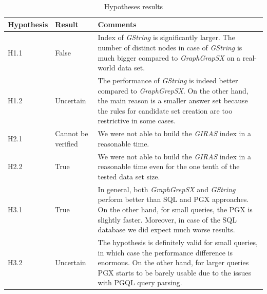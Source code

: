 \begin{table}[h]
	\centering
	\renewcommand{\arraystretch}{2.5}
	\setlength{\arrayrulewidth}{0.5mm
	}
	\begin{tabular}[h!]{|p{2cm}|p{2cm}|p{9cm}|}
		\hline
		\rowcolor{lightgray}
		Hypothesis & Result & Comments\\ \hline
		H1.1 & False & Index of \textit{GString} is significantly larger. The number of distinct nodes in case of \textit{GString} is much bigger compared to \textit{GraphGrapSX} on a real-world data set.\\ \hline
		H1.2 & Uncertain & The performance of \textit{GString} is indeed better compared to \textit{GraphGrepSX}. On the other hand, the main reason is a smaller answer set because the rules for candidate set creation are too restrictive in some cases.\\ \hline
		H2.1 & Cannot be verified & We were not able to build the \textit{GIRAS} index in a reasonable time.\\ \hline
		H2.2 & True & We were not able to build the \textit{GIRAS} index in a reasonable time even for the one tenth of the tested data set size.\\ \hline
		H3.1 & True & In general, both \textit{GraphGrepSX} and \textit{GString} perform better than SQL and PGX approaches. On the other hand, for small queries, the PGX is slightly faster. Moreover, in case of the SQL database we did expect much worse results.\\ \hline
		H3.2 & Uncertain & The hypothesis is definitely valid for small queries, in which case the performance difference is enormous. On the other hand, for larger queries PGX starts to be barely usable due to the issues with PGQL query parsing.\\ \hline
	\end{tabular}
	\caption{Hypotheses results}
	\label{hypothesisresults}
\end{table}